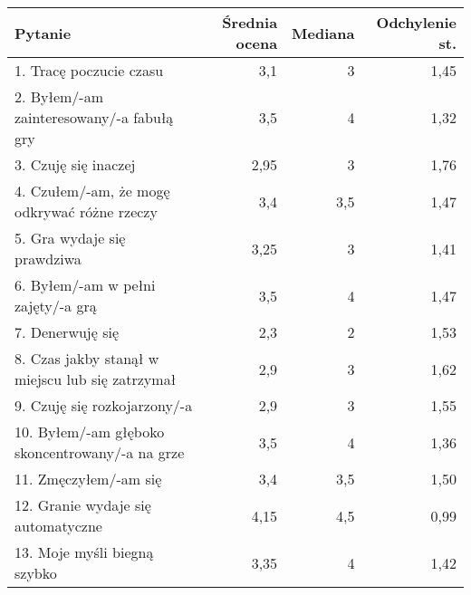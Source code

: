 \begin{table}[h!]
    \begin{center}
        \begin{tabular}{|m{10em}|r|r|r|}
            \hline
            Pytanie                                                           & Średnia ocena & Mediana & Odchylenie st. \\
            \hline
            1. Tracę poczucie czasu                                           & 3,1           & 3       & 1,45           \\
            2. Byłem/-am \newline zainteresowany/-a fabułą gry                & 3,5           & 4       & 1,32           \\
            3. Czuję się inaczej                                              & 2,95          & 3       & 1,76           \\
            4. Czułem/-am, że mogę odkrywać różne rzeczy                      & 3,4           & 3,5     & 1,47           \\
            5. Gra wydaje się prawdziwa                                       & 3,25          & 3       & 1,41           \\
            6. Byłem/-am \newline w pełni zajęty/-a grą                       & 3,5           & 4       & 1,47           \\
            7. Denerwuję się                                                  & 2,3           & 2       & 1,53           \\
            8. Czas jakby stanął w miejscu lub się zatrzymał                  & 2,9           & 3       & 1,62           \\
            9. Czuję się \newline rozkojarzony/-a                             & 2,9           & 3       & 1,55           \\
            10. Byłem/-am głęboko \newline skoncentrowany/-a \newline na grze & 3,5           & 4       & 1,36           \\
            11. Zmęczyłem/-am się                                             & 3,4           & 3,5     & 1,50           \\
            12. Granie wydaje się automatyczne                                & 4,15          & 4,5     & 0,99           \\
            13. Moje myśli \newline biegną szybko                             & 3,35          & 4       & 1,42           \\

\end{tabular}
\end{center}
\end{table}

